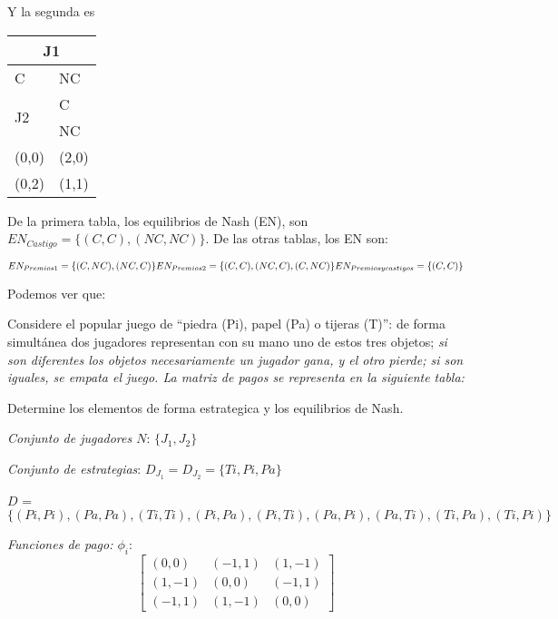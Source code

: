 \documentclass{homework}
\begin{document}
Y la segunda es \\

\centering
\begin{tabular}{ll}
\hline
\multicolumn{2}{|c|}{J1} \\ \hline
C & NC \\ \hline
\hline
    \multirow{2}{|r|}{J2}& C\\
    & NC\\ \hline

(0,0) & (2,0) \\
(0,2)  & (1,1) 
\end{tabular}

De la primera tabla, los equilibrios de Nash (EN), son $EN_{Castigo} = \{(C,C), (NC,NC)\}$. De las otras tablas, los EN son:


\begin{equation}
    EN_{Premios 1} = \{(C,NC), (NC, C)\} \\
    EN_{Premios 2} = \{(C,C), (NC, C), (C, NC)\} \\
    EN_{Premios y castigos} = \{(C,C)\}
\end{equation}

Podemos ver que:





\question Considere el popular juego de “piedra (Pi), papel (Pa) o tijeras (T)”: de forma simultánea dos
jugadores representan con su mano uno de estos tres objetos; \textit{si son diferentes los objetos
necesariamente un jugador gana, y el otro pierde; si son iguales, se empata el juego. La matriz de
pagos se representa en la siguiente tabla:}

Determine los elementos de forma estrategica y los equilibrios de Nash.

\emph{Conjunto de jugadores $N$}: $\{ J_1, J_2\}$

\emph{Conjunto de estrategias}: $D_{J_1} = D_{J_2} = \{ Ti, Pi, Pa\}$

$D$ = $\{ (Pi, Pi), (Pa, Pa), (Ti, Ti), (Pi, Pa), (Pi, Ti), (Pa, Pi), (Pa, Ti), (Ti, Pa), (Ti, Pi)\}$


\emph{Funciones de pago: $\phi_i $}: 
\begin{equation}
\begin{bmatrix}
(0,0) & (-1,1) & (1,-1)\\
(1,-1) & (0,0) & (-1,1)\\
(-1,1) & (1,-1) & (0,0)
\end{bmatrix}
\end{equation}
\end{document}
